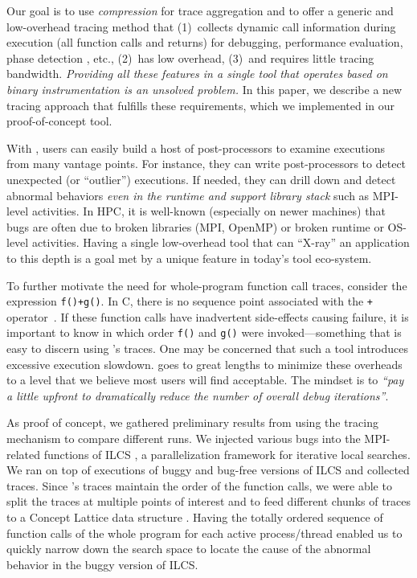 %
Our goal is to use \textit{compression} for trace aggregation and to offer 
a generic and low-overhead tracing method that 
(1)~collects dynamic call information during execution (all function calls and returns) for debugging, performance evaluation, phase detection \cite{cbb}, etc.,
(2)~has low overhead, 
(3)~and requires little tracing bandwidth.
%
{\em Providing all these features in a single tool
that operates based on binary instrumentation
is an unsolved problem.}
%
In this paper, we describe a new tracing approach that fulfills these requirements, which we implemented in our proof-of-concept \parlot tool.


%
With \parlot, users can easily build a host of post-processors to examine
executions from many vantage points.
%
For instance, they can write post-processors
to detect unexpected (or ``outlier'') executions.
%
If needed, they can 
drill down and detect abnormal behaviors {\em even in the runtime and
support library stack} such as MPI-level activities.
%
In HPC, it is well-known (especially on newer machines) that bugs are often due to
broken libraries (MPI, OpenMP) or broken runtime or OS-level activities.
%
Having a single low-overhead tool that can ``X-ray'' an application to this depth is a goal met by \parlot \text{-} a unique feature in today's tool eco-system.

To further motivate the need for whole-program function call
traces, consider the expression {\tt f()+g()}.
%
In C, there is no sequence point associated with the {\tt +}
operator~\cite{sequence-points-in-C}.
%
If these function calls have inadvertent side-effects causing 
failure, it is important to know in which order {\tt f()}
and {\tt g()} were invoked---something that is easy to discern using
\parlot 's traces.
%
One may be concerned that such a tool introduces excessive execution slowdown.
%
\parlot goes to great lengths to minimize these overheads to a level that we believe most users will find acceptable. The mindset is to \textit{``pay a little upfront to dramatically reduce the number of overall debug iterations''}. 

%
As proof of concept, we gathered preliminary results from using the \parlot tracing mechanism to compare different runs.
%
We injected various bugs into the MPI-related functions of ILCS \cite{ilcs}, a parallelization framework for iterative local searches.
%
We ran \parlot on top of executions of buggy and bug-free versions of ILCS and collected traces.
%
Since \parlot's traces maintain the order of the function calls, we were able to split the traces at multiple points of interest and to feed different chunks of traces to a Concept Lattice data structure \cite{clbook} \cite{clconst}. 
%
Having the totally ordered sequence of function calls of the whole program for each active process/thread enabled us to quickly narrow down the search space to locate the cause of the abnormal behavior in the buggy version of ILCS. 

